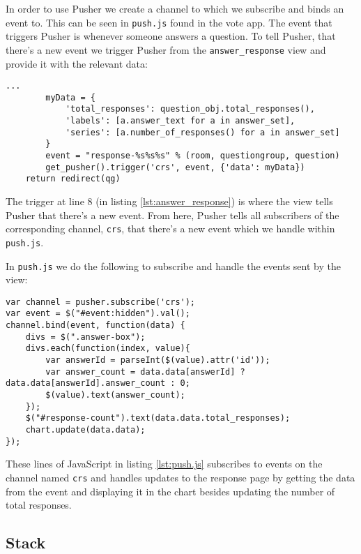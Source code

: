 In order to use Pusher we create a channel to which we subscribe and binds an event to. This can be seen in \texttt{push.js} found in the vote app. The event that triggers Pusher is whenever someone answers a question. To tell Pusher, that there's a new event we trigger Pusher from the \texttt{answer\_response} view and provide it with the relevant data:

\begin{lstlisting}[caption=Selected parts of the answer\_response view, label=lst:answer_response]
        ...
        myData = {
            'total_responses': question_obj.total_responses(),
            'labels': [a.answer_text for a in answer_set],
            'series': [a.number_of_responses() for a in answer_set]
        }
        event = "response-%s%s%s" % (room, questiongroup, question)
        get_pusher().trigger('crs', event, {'data': myData})
    return redirect(qg)
\end{lstlisting}

The trigger at line 8 (in listing \ref{lst:answer_response}) is where the view tells Pusher that there's a new event. From here, Pusher tells all subscribers of the corresponding channel, \texttt{crs}, that there's a new event which we handle within \texttt{push.js}.

In \texttt{push.js} we do the following to subscribe and handle the events sent by the view:

\begin{lstlisting}[caption=Selected parts of push.js, label=lst:push.js]
var channel = pusher.subscribe('crs');
var event = $("#event:hidden").val();
channel.bind(event, function(data) {
    divs = $(".answer-box");
    divs.each(function(index, value){
        var answerId = parseInt($(value).attr('id'));
        var answer_count = data.data[answerId] ? data.data[answerId].answer_count : 0;
        $(value).text(answer_count);
    });
    $("#response-count").text(data.data.total_responses);
    chart.update(data.data);
});
\end{lstlisting}

These lines of JavaScript in listing \ref{lst:push.js} subscribes to events on the channel named \texttt{crs} and handles updates to the response page by getting the data from the event and displaying it in the chart besides updating the number of total responses.

\subsection{Stack}
